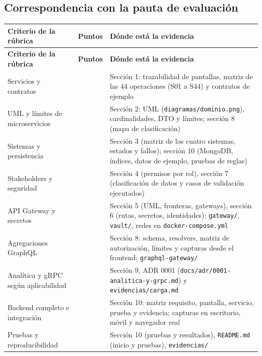 \subsection*{Correspondencia con la pauta de evaluación}

{\small
\setlength{\tabcolsep}{3pt}\renewcommand{\arraystretch}{1.15}
\begin{longtable}{|>{\raggedright\arraybackslash}p{}|>{\raggedleft\arraybackslash}p{}|>{\raggedright\arraybackslash}p{}|}
\hline
\textbf{Criterio de la rúbrica} & \textbf{Puntos} & \textbf{Dónde está la evidencia} \\ \hline
\endfirsthead
\hline
\textbf{Criterio de la rúbrica} & \textbf{Puntos} & \textbf{Dónde está la evidencia} \\ \hline
\endhead
Servicios y contratos & 10 & Sección 1: trazabilidad de pantallas, matriz de las 44 operaciones (S01 a S44) y contratos de ejemplo \\ \hline
UML y límites de microservicios & 10 & Sección 2: UML (\texttt{diagramas/\allowbreak{}dominio.\allowbreak{}png}), cardinalidades, DTO y límites; sección 8 (mapa de clasificación) \\ \hline
Sistemas y persistencia & 10 & Sección 3 (matriz de los cuatro sistemas, estados y fallos); sección 10 (MongoDB, índices, datos de ejemplo, pruebas de reglas) \\ \hline
Stakeholders y seguridad & 10 & Sección 4 (permisos por rol), sección 7 (clasificación de datos y casos de validación ejecutados) \\ \hline
API Gateway y secretos & 10 & Sección 5 (UML, fronteras, gateways), sección 6 (rutas, secretos, identidades); \texttt{gateway/\allowbreak{}}, \texttt{vault/\allowbreak{}}, redes en \texttt{docker-\allowbreak{}compose.\allowbreak{}yml} \\ \hline
Agregaciones GraphQL & 15 & Sección 8: schema, resolvers, matriz de autorización, límites y capturas desde el frontend; \texttt{graphql-\allowbreak{}gateway/\allowbreak{}} \\ \hline
Analítica y gRPC según aplicabilidad & 10 & Sección 9, ADR 0001 (\texttt{docs/\allowbreak{}adr/\allowbreak{}0001-\allowbreak{}analitica-\allowbreak{}y-\allowbreak{}grpc.\allowbreak{}md}) y \texttt{evidencias/\allowbreak{}carga.\allowbreak{}md} \\ \hline
Backend completo e integración & 15 & Sección 10: matriz requisito, pantalla, servicio, prueba y evidencia; capturas en escritorio, móvil y navegador real \\ \hline
Pruebas y reproducibilidad & 10 & Sección 10 (pruebas y resultados), \texttt{README.\allowbreak{}md} (inicio y pruebas), \texttt{evidencias/\allowbreak{}} \\ \hline
\end{longtable}
}
